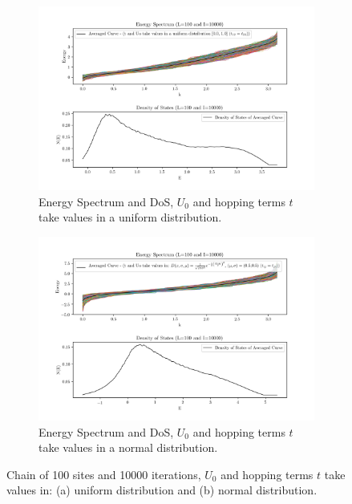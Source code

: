 \documentclass[12pt]{article}
\begin{document}
\begin{figure}[ht]
		\centering
        \begin{subfigure}[a]{\textwidth}
        		\centering
                \includegraphics[scale=0.65]{EDOSRoRU.png}
                \caption{Energy Spectrum and DoS, $U_{0}$ and hopping terms $t$ take values in a uniform distribution.}
                \label{f6a}
        \end{subfigure}
        \begin{subfigure}[b]{\textwidth}
        		\centering
                \includegraphics[scale=0.65]{EDOSRoRN.png}
                \caption{ Energy Spectrum and DoS, $U_{0}$ and hopping terms $t$ take values in a normal distribution.}
                \label{f6b}
        \end{subfigure}
        \caption{Chain of 100 sites and 10000 iterations, $U_{0}$ and hopping terms $t$ take values in: (a) uniform distribution and (b)  normal distribution.}
        \label{f6}
\end{figure}
\end{document}
